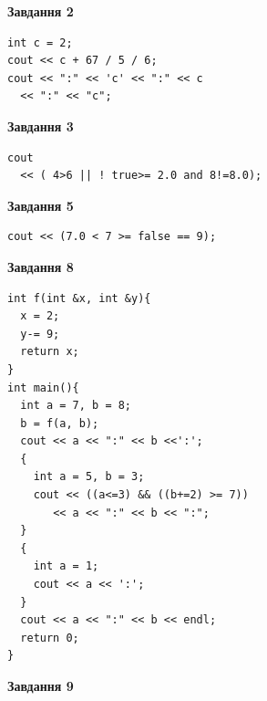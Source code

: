 \documentclass[12pt, ukrainian]{article}
\begin{document}
{\begin {large}
\begin{minipage}[t]{7.0cm}
\end{minipage}
\vline \hspace{1mm}
\begin{minipage}[t]{11.0cm}

\begin{center}
\textbf{Завдання 2}
\end{center}
\vspace{-8mm}

\begin{verbatim}
int c = 2;
cout << c + 67 / 5 / 6;
cout << ":" << 'c' << ":" << c 
  << ":" << "c";
\end{verbatim}



\begin{center}
\textbf{Завдання 3}
\end{center}
\vspace{-8mm}

\begin{verbatim}
cout 
  << ( 4>6 || ! true>= 2.0 and 8!=8.0);
\end{verbatim}



\begin{center}
\textbf{Завдання 5}
\end{center}
\vspace{-8mm}

\begin{verbatim}
cout << (7.0 < 7 >= false == 9);
\end{verbatim}



\begin{center}
\textbf{Завдання 8}
\end{center}
\vspace{-8mm}

\begin{verbatim}
int f(int &x, int &y){
  x = 2;
  y-= 9;
  return x;
}
int main(){
  int a = 7, b = 8;
  b = f(a, b);
  cout << a << ":" << b <<':';
  {
    int a = 5, b = 3;
    cout << ((a<=3) && ((b+=2) >= 7))
       << a << ":" << b << ":";
  }
  {
    int a = 1;
    cout << a << ':';
  }
  cout << a << ":" << b << endl;
  return 0;
}
\end{verbatim}

\end{minipage}


\begin{minipage}[t]{7.0cm}

\begin{center}
\textbf{Завдання 9}
\end{center}
\vspace{-8mm}


\end{minipage}
\end{large}}
\end{document}
